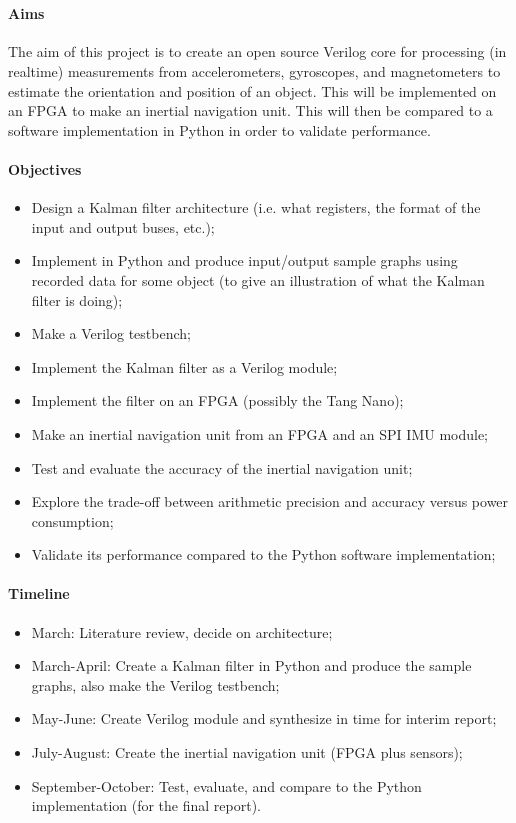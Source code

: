 \documentclass[12pt]{article}
\begin{document}
 \\

\paragraph{Aims}

The aim of this project is to create an open source Verilog core for processing (in realtime) measurements from accelerometers, gyroscopes, and magnetometers to estimate the orientation and position of an object. This will be implemented on an FPGA to make an inertial navigation unit. This will then be compared to a software implementation in Python in order to validate performance.

\paragraph{Objectives}

\begin{itemize}[noitemsep]
	\item Design a Kalman filter architecture (i.e. what registers, the format of the input and output buses, etc.);
	\item Implement in Python and produce input/output sample graphs using recorded data for some object (to give an illustration of what the Kalman filter is doing);
	\item Make a Verilog testbench;
	\item Implement the Kalman filter as a Verilog module;
	\item Implement the filter on an FPGA (possibly the Tang Nano);
	\item Make an inertial navigation unit from an FPGA and an SPI IMU module;
	\item Test and evaluate the accuracy of the inertial navigation unit;
	\item Explore the trade-off between arithmetic precision and accuracy versus power consumption;
	\item Validate its performance compared to the Python software implementation;
\end{itemize}

\paragraph{Timeline}
\begin{itemize}[noitemsep]
\item March: Literature review, decide on architecture;
\item March-April: Create a Kalman filter in Python and produce the sample graphs, also make the Verilog testbench;
\item May-June: Create Verilog module and synthesize in time for interim report;
\item July-August: Create the inertial navigation unit (FPGA plus sensors);
\item September-October: Test, evaluate, and compare to the Python implementation (for the final report).
\end{itemize}
\end{document}

